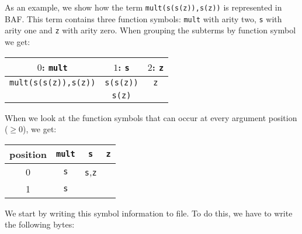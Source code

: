 \documentclass{article}
\begin{document}
As an example, we show how the term \texttt{mult(s(s(z)),s(z))} is represented in BAF. This term contains three function
symbols: \texttt{mult} with arity two, \texttt{s} with arity one  and \texttt{z} with arity zero. When grouping the subterms by function symbol we get:
\begin{center}
\begin{tabular}{|c|c|c|}
\hline
$0$: \texttt{mult}&$1$: \texttt{s}&$2$: \texttt{z}\\
\hline
\texttt{mult(s(s(z)),s(z))}&\texttt{s(s(z))}&\texttt{z}\\
                           &\texttt{s(z)}&\\
\hline
\end{tabular}
\end{center}
When we look at the function symbols that can occur at every argument position ($\geq 0$), we get:
\begin{center}
\begin{tabular}{|c|c|c|c|}
\hline
position&\texttt{mult}&\texttt{s}&\texttt{z}\\
\hline
0&\texttt{s}&\texttt{s},\texttt{z}&\\
1&\texttt{s}&&\\
\hline

\end{tabular}
\end{center}
We start by writing this symbol information to file. To do this, we have to write the following bytes:
\end{document}
